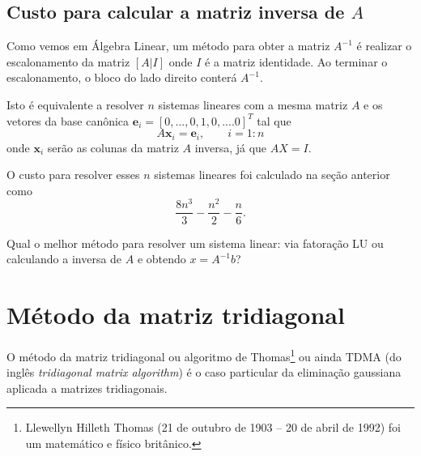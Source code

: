 \subsection{Custo para calcular a matriz inversa de $A$}
Como vemos em Álgebra Linear, um método para obter a matriz $A^{-1}$ é realizar o escalonamento da matriz $[A|I]$ onde $I$ é a matriz identidade. Ao terminar o escalonamento, o bloco do lado direito conterá $A^{-1}$.

Isto é equivalente a resolver $n$ sistemas lineares com a mesma matriz $A$ e os vetores da base canônica $\pmb e_i = [0,...,0,1,0,....0]^T$ tal que
$$ A \pmb x_i = \pmb e_i, \quad\quad i=1:n $$
onde $\pmb x_i$ serão as colunas da matriz $A$ inversa, já que $A X=I$.

O custo para resolver esses $n$ sistemas lineares foi calculado na seção anterior como
$$\frac{8n^3}{3}-\frac{n^2}{2}-\frac{n}{6}.$$

\begin{ex}
 Qual o melhor método para resolver um sistema linear: via fatoração LU ou calculando a inversa de $A$ e obtendo $x=A^{-1}b$?
\end{ex}


\section{Método da matriz tridiagonal}
O método da matriz tridiagonal ou algoritmo de Thomas\footnote{Llewellyn Hilleth Thomas (21 de outubro de 1903 – 20 de abril de 1992) foi um matemático e físico britânico.} ou ainda TDMA (do inglês {\it tridiagonal matrix algorithm}) é o caso particular da eliminação gaussiana aplicada a matrizes tridiagonais.

